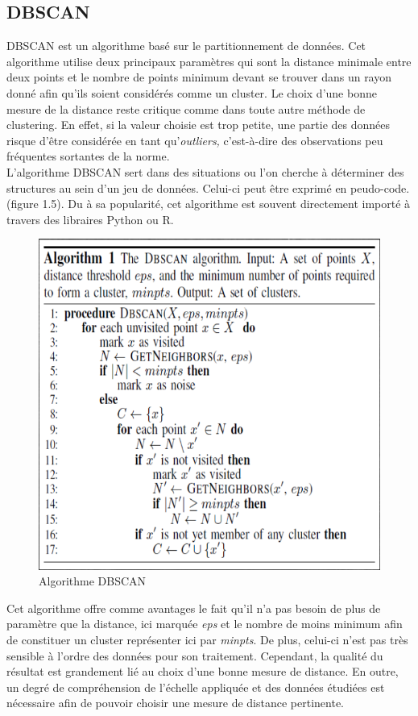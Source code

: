 \documentclass[memoire.tex]{subfiles}
\begin{document}
\newpage
\subsection{DBSCAN}
DBSCAN est un algorithme basé sur le partitionnement de données. Cet algorithme utilise deux principaux paramètres qui sont la distance minimale entre deux points et le nombre de points minimum devant se trouver dans un rayon donné afin qu'ils soient considérés comme un cluster\cite{ref12}. Le choix d'une bonne mesure de la distance reste critique comme dans toute autre méthode de clustering. En effet, si la valeur choisie est trop petite, une partie des données risque d'être considérée en tant qu'\textit {outliers,} c'est-à-dire des observations peu fréquentes sortantes de la norme.\\
L'algorithme DBSCAN sert dans des situations ou l'on cherche à déterminer des structures au sein d'un jeu de données. Celui-ci peut être exprimé en peudo-code.(figure 1.5). Du à sa popularité, cet algorithme est souvent directement importé à travers des libraires Python ou R.
	\begin{figure}[h!]
		\centerline{\includegraphics[scale=0.5]{img/dbscan.png}}
		\caption{Algorithme DBSCAN}
	\end{figure}
Cet algorithme offre comme avantages le fait qu'il n'a pas besoin de plus de paramètre que la distance, ici marquée \textit{eps} et le nombre de moins minimum afin de constituer un cluster représenter ici par \textit{minpts}. De plus, celui-ci n'est pas très sensible à l'ordre des données pour son traitement. Cependant, la qualité du résultat est grandement lié au choix d'une bonne mesure de distance. En outre, un degré de compréhension de l'échelle appliquée et des données étudiées est nécessaire afin de pouvoir choisir une mesure de distance pertinente.\\
\end{document}
